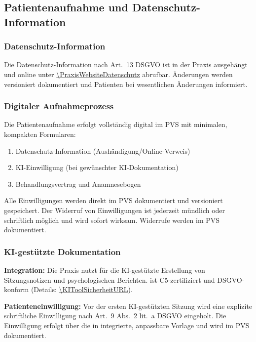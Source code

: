 \subsection{Patientenaufnahme und Datenschutz-Information}
\label{sec:patientenaufnahme}

\subsubsection{Datenschutz-Information}

Die Datenschutz-Information nach Art.\ 13 DSGVO ist in der Praxis ausgehängt und online
unter \url{\PraxisWebsiteDatenschutz} abrufbar. Änderungen werden
versioniert dokumentiert und Patienten bei wesentlichen Änderungen informiert.

\subsubsection{Digitaler Aufnahmeprozess}

Die Patientenaufnahme erfolgt vollständig digital im PVS mit minimalen, kompakten Formularen:
\begin{enumerate}
  \item Datenschutz-Information (Aushändigung/Online-Verweis)
  \item KI-Einwilligung (bei gewünschter KI-Dokumentation)
  \item Behandlungsvertrag und Anamnesebogen
\end{enumerate}

Alle Einwilligungen werden direkt im PVS dokumentiert und versioniert gespeichert.
Der Widerruf von Einwilligungen ist jederzeit mündlich oder schriftlich möglich
und wird sofort wirksam. Widerrufe werden im PVS dokumentiert.

\subsubsection{KI-gestützte Dokumentation}

\textbf{\KIToolName{} Integration:} Die Praxis nutzt \KIToolName{} für die
KI-gestützte Erstellung von Sitzungsnotizen und psychologischen Berichten. \KIToolName{}
ist C5-zertifiziert und DSGVO-konform (Details: \url{\KIToolSicherheitURL}).

\textbf{Patienteneinwilligung:} Vor der ersten KI-gestützten Sitzung wird eine explizite
schriftliche Einwilligung nach Art.\ 9 Abs.\ 2 lit.\ a DSGVO eingeholt. Die Einwilligung
erfolgt über die in \KIToolName{} integrierte, anpassbare Vorlage und wird im PVS dokumentiert.

